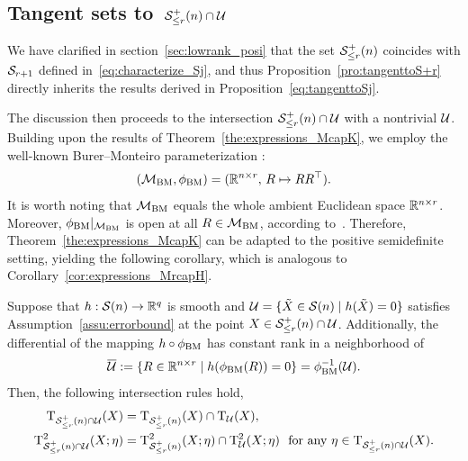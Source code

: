 \subsection{Tangent sets to~$\mathcal{S}^+_{\le r}(n)\cap\mathcal{U}$}\label{app:S+U}
We have clarified in section~\ref{sec:lowrank_posi} that the set $\mathcal{S}^+_{\le r}(n)$ coincides with $\mathcal{S}_{r+1}$ defined in~\eqref{eq:characterize_Sj}, and thus Proposition~\ref{pro:tangenttoS+r} directly inherits the results derived in Proposition~\ref{eq:tangenttoSj}. 

The discussion then proceeds to the intersection $\mathcal{S}^+_{\le r}(n)\cap\mathcal{U}$ with a nontrivial $\mathcal{U}$. Building upon the results of Theorem~\ref{the:expressions_McapK}, we employ the well-known Burer--Monteiro parameterization \cite{burer2003BM}:
\begin{equation}\label{eq:BM_para}
(\mathcal{M}_{\mathrm{BM}},\phi_{\mathrm{BM}})=(\mathbb{R}^{n\times r},\, R\mapsto RR^\top).
\end{equation}
It is worth noting that $\mathcal{M}_{\mathrm{BM}}$ equals the whole ambient Euclidean space $\mathbb{R}^{n\times r}$. Moreover, $\phi_{\mathrm{BM}}|_{\mathcal{M}_{\mathrm{BM}}}$ is open at all $R\in\mathcal{M}_{\mathrm{BM}}$, according to~\cite[Theorem~2.3, Proposition 2.7]{levin2025effect}. Therefore, Theorem~\ref{the:expressions_McapK} can be adapted to the positive semidefinite setting, yielding the following corollary, which is analogous to Corollary~\ref{cor:expressions_MrcapH}.

\begin{corollary}\label{cor:expressions_S+capU}
    Suppose that $h:\mathcal{S}(n)\to\mathbb{R}^q$ is smooth and $\mathcal{U}=\{\tilde{X}\in\mathcal{S}(n)\mid h(\tilde{X})=0\}$ satisfies Assumption~\ref{assu:errorbound} at the point $X\in\mathcal{S}^+_{\le r}(n)\cap\mathcal{U}$. Additionally, the differential of the mapping $h\circ\phi_{\mathrm{BM}}$ has constant rank in a neighborhood of $$\overline{\mathcal{U}}:=\{R\in \mathbb{R}^{n\times r}\mid h(\phi_{\mathrm{BM}}(R))=0\}=\phi_{\mathrm{BM}}^{-1}(\mathcal{U}).$$ Then, the following intersection rules hold,
    \begin{equation}\label{eq:expressions_S+capU}
    \begin{aligned}
        \Btangent_{\boundedranksdp(n)\cap\uanifold}(X) &= \Btangent_{\boundedranksdp(n)}(X)\cap\Btangent_{\uanifold}(X),
        \\
        \tangenttwo_{\boundedranksdp(n)\cap\uanifold}(X;\eta) &= \tangenttwo_{\boundedranksdp(n)}(X;\eta)\cap\tangenttwo_{\uanifold}(X;\eta)\ \ \text{for any}\ \eta\in\Btangent_{\boundedranksdp(n)\cap\uanifold}(X).
    \end{aligned}
    \end{equation}    
\end{corollary}


